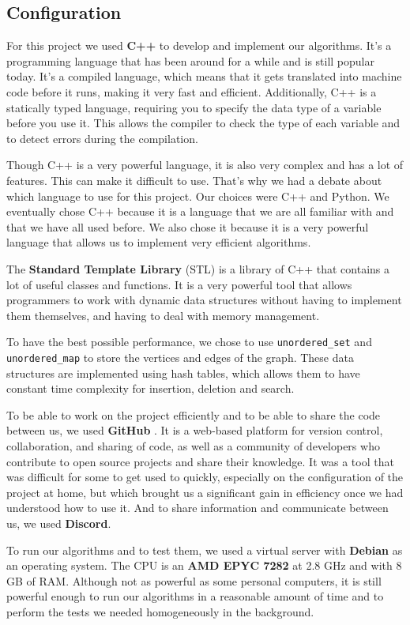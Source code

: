 \subsection{Configuration}

For this project we used \textbf{C++} to develop and implement our algorithms. 
It's a programming language that has been around for a while and is still popular today. 
It's a compiled language, which means that it gets translated into machine code before it runs, making it very fast and efficient. 
Additionally, C++ is a statically typed language, requiring you to specify the data type of a variable before you use it. 
This allows the compiler 
to check the type of each variable and to detect errors during the compilation. \bigskip

Though C++ is a very powerful language, it is also very complex and has a lot of
features. This can make it difficult to use. That's why we had a debate about
which language to use for this project. Our choices were C++ and Python. We
eventually chose C++ because it is a language that we are all familiar with and
that we have all used before. We also chose it because it is a very powerful
language that allows us to implement very efficient algorithms.\bigskip

The \textbf{Standard Template Library} (STL) is a library of C++ that contains 
a lot of useful classes and functions. It is a very powerful tool that allows 
programmers to work with dynamic data structures without having to implement 
them themselves, and having to deal with memory management. \bigskip

To have the best possible performance, we chose to use \texttt{unordered\_set}
and \texttt{unordered\_map} to store the vertices and edges of the graph. These
data structures are implemented using hash tables, which allows them to have
constant time complexity for insertion, deletion and search. \bigskip

To be able to work on the project efficiently and to be able to share the code
between us, we used \textbf{GitHub}\footnotemark 
{}.
It is a web-based platform for version control, collaboration, and sharing of
code, as well as a community of developers who contribute to open source projects
and share their knowledge. It was a tool that was difficult for some to get used
to quickly, especially on the configuration of the project at home, but which
brought us a significant gain in efficiency once we had understood how to use it.
And to share information and communicate between us, we used \textbf{Discord}.
\bigskip

To run our algorithms and to test them, we used a virtual server with \textbf{Debian}
as an operating system. The CPU is an \textbf{AMD EPYC 7282} at 2.8 GHz and with
8 GB of RAM. Although not as powerful as some personal computers, it is still
powerful enough to run our algorithms in a reasonable amount of time and to
perform the tests we needed homogeneously in the background.